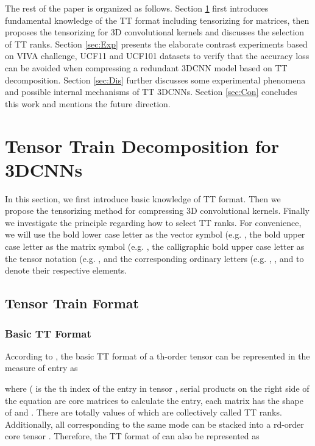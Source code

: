 \documentclass[a4paper,fleqn]{cas-dc}
\begin{document}
The rest of the paper is organized as follows. Section \ref{sec:Method} first introduces fundamental knowledge of the TT format including tensorizing for matrices, then proposes the tensorizing for 3D convolutional kernels and discusses the selection of TT ranks. Section \ref{sec:Exp} presents the elaborate contrast experiments based on VIVA challenge, UCF11 and UCF101 datasets to verify that the accuracy loss can be avoided when compressing a redundant 3DCNN model based on TT decomposition. Section \ref{sec:Dis} further discusses some experimental phenomena and possible internal mechanisms of TT 3DCNNs. Section \ref{sec:Con} concludes this work and mentions the future direction.




\section{Tensor Train Decomposition for 3DCNNs}\label{sec:Method}

In this section, we first introduce basic knowledge of TT format. Then we propose the tensorizing method for compressing 3D convolutional kernels. Finally we investigate the principle  regarding  how to select TT ranks. For convenience, we will use the bold lower case letter as the vector symbol (e.g. , the bold upper case letter as the matrix symbol (e.g. , the calligraphic bold upper case letter as the tensor notation (e.g. , and the corresponding ordinary letters (e.g. , , and  to denote their respective elements.

\subsection{Tensor Train Format}

\subsubsection{Basic TT Format}\quad

According to \citet{Oseledets_2011_InventTT}, the basic TT format of a th-order tensor  can be represented in the measure of entry as

where  ( is the th index of the entry in tensor , serial products on the right side of the equation are core matrices to calculate the entry, each matrix  has the shape of  and . There are totally  values of  which are collectively called TT ranks.  Additionally, all  corresponding to the same mode  can be stacked into a rd-order core tensor . Therefore, the TT format of  can also be represented as \citep{Lee_2016_HTTT}
\end{document}
